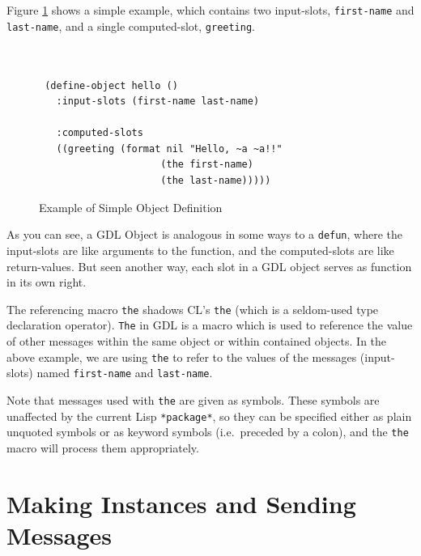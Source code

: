 \documentclass [11pt]{book}
\begin{document}
Figure 
\ref{fig:object-hello} shows a simple example, which contains two input-slots, \texttt{first-name} and \texttt{last-name}, and a single computed-slot, \texttt{greeting}.
\begin{figure}
\begin{lrbox}{\boxedverb}
\begin{minipage}{\linewidth}

\begin{verbatim}


 (define-object hello ()
   :input-slots (first-name last-name)

   :computed-slots 
   ((greeting (format nil "Hello, ~a ~a!!" 
                     (the first-name) 
                     (the last-name)))))

\end{verbatim}
\end{minipage}
\end{lrbox}
\fbox{\usebox{\boxedverb}}

\caption{Example of Simple Object Definition}

\label{fig:object-hello}

\end{figure}
As you can see, a GDL Object is analogous in some ways to a \texttt{defun}, where the input-slots are like arguments to the function,
and the computed-slots are like return-values. But seen another way,
each slot in a GDL object serves as function in its own right.

The referencing macro \texttt{the} shadows CL's \texttt{the} (which is a seldom-used type declaration operator). \texttt{The} in GDL is a macro which is used to reference the value of other messages 
within the same object or within contained objects. In the above example, we are using \texttt{the} to refer to the values of the messages (input-slots) named \texttt{first-name} and \texttt{last-name}. 

Note that messages used with \texttt{the} are given as symbols. These symbols are unaffected by the current Lisp \texttt{*package*}, so they can be specified either as plain unquoted symbols or as keyword
symbols (i.e.\ preceded by a colon), and the \texttt{the} macro will process them appropriately.

\section{Making Instances and Sending Messages}

\label{sec:makinginstancesandsendingmessages}
\end{document}
